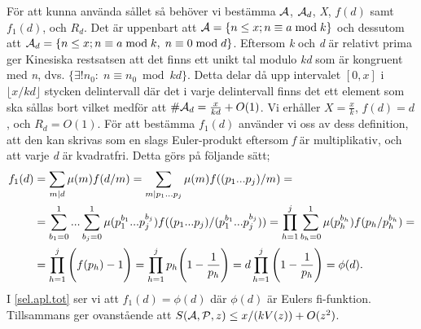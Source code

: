 För att kunna använda sållet så behöver vi bestämma \(\A\), \(\A_d\), \textit{X}, \(f(d)\) samt \(f_1(d)\), och \(R_d\). 
Det är uppenbart att \(\A = \{n\leq x; n \equiv a \bmod k\}\) och dessutom att \(\A_d = \{n \leq x; n \equiv a \bmod k,\; n \equiv 0 \bmod d\}\). 
Eftersom \textit{k} och \textit{d} är relativt prima ger Kinesiska restsatsen att det finns ett unikt tal modulo \textit{kd} som är kongruent med \textit{n}, dvs. \(\{\exists! n_0:\; n \equiv n_0 \bmod kd\}\). 
Detta delar då upp intervalet \([0, x]\) i \(\lfloor x/{kd}\rfloor\) stycken delintervall där det i varje delintervall finns det ett element som ska sållas bort vilket medför att \(\#\A_d = \frac{x}{kd} + O(1)\). 
Vi erhåller \(X = \frac{x}{k}\), \(f(d) = d\), och \(R_d = O(1)\). 
För att bestämma \(f_1(d)\) använder vi oss av dess definition, att den kan skrivas som en slags Euler-produkt eftersom \textit{f} är multiplikativ, och att varje \textit{d} är kvadratfri. 
Detta görs på följande sätt;
\begin{align}
    f_1(d) &= \sum_{m\divides d}\mu(m)f(d/m) = \sum_{m\divides p_1...p_j}\mu(m)f((p_1...p_j)/m) = \nonumber\\
    &=\sum_{b_1 = 0}^1...\sum_{b_j = 0}^1\mu(p_1^{b_1}...p_j^{b_j})f((p_1...p_j)/(p_1^{b_1}...p_j^{b_j})) = \prod_{h = 1}^j\sum_{b_h = 0}^1\mu(p_h^{b_h})f(p_h/p_h^{b_h}) = \nonumber\\
    &= \prod_{h = 1}^j\Bigg(f(p_h) - 1\Bigg) = \prod_{h = 1}^j p_h\Bigg(1 - \frac{1}{p_h}\Bigg) = d\prod_{h = 1}^j \Bigg(1 - \frac{1}{p_h}\Bigg) = \phi(d).\label{sel.apl.tot}
\end{align}
I \eqref{sel.apl.tot} ser vi att \(f_1(d) = \phi(d)\) där \(\phi(d)\) är Eulers fi-funktion. 
Tillsammans ger ovanstående att \(\S{A}{P}{z} \leq x/(kV(z)) + O(z^2)\). 

